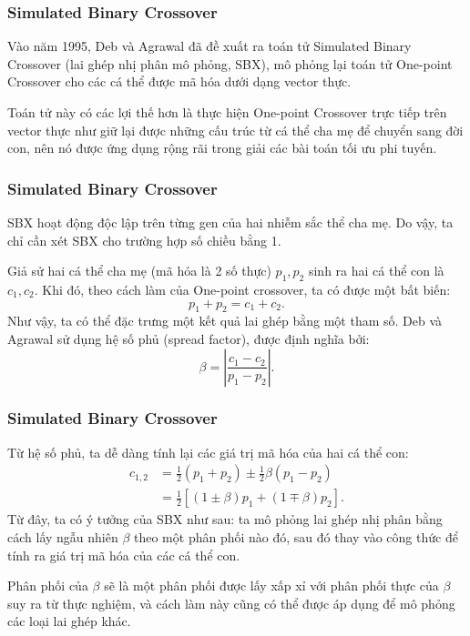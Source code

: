 \begin{frame}[fragile]
\frametitle{Simulated Binary Crossover}
Vào năm 1995, Deb và Agrawal đã đề xuất ra toán tử Simulated Binary Crossover
(lai ghép nhị phân mô phỏng, SBX), mô phỏng lại toán tử One-point Crossover cho
các cá thể được mã hóa dưới dạng vector thực.

Toán tử này có các lợi thế hơn là thực hiện One-point Crossover trực tiếp trên
vector thực như giữ lại được những cấu trúc từ cá thể cha mẹ để chuyển sang đời
con, nên nó được ứng dụng rộng rãi trong giải các bài toán tối ưu phi tuyến.
\end{frame}

\begin{frame}[fragile]
\frametitle{Simulated Binary Crossover}
SBX hoạt động độc lập trên từng gen của hai nhiễm sắc thể cha mẹ. Do vậy, ta chỉ
cần xét SBX cho trường hợp số chiều bằng 1.

Giả sử hai cá thể cha mẹ (mã hóa là 2 số thực) \( p_{1}, p_{2} \) sinh ra hai cá
thể con là \( c_{1}, c_{2} \). Khi đó, theo cách làm của One-point crossover, ta
có được một bất biến:
\[
  p_{1} + p_{2} = c_{1} + c_{2}
.\] 
Như vậy, ta có thể đặc trưng một kết quả lai ghép bằng một tham số. Deb và
Agrawal sử dụng hệ số phủ (spread factor), được định nghĩa bởi:
\[
  \beta = \left| \frac{c_{1} - c_{2}}{p_{1} - p_{2}} \right| 
.\] 
\end{frame}

\begin{frame}[fragile]
\frametitle{Simulated Binary Crossover}
Từ hệ số phủ, ta dễ dàng tính lại các giá trị mã hóa của hai cá thể con:
\begin{align*}
  c_{1,2} &= \frac{1}{2}(p_{1} + p_{2}) \pm \frac{1}{2}\beta(p_{1} - p_{2})\\
  &= \frac{1}{2} \left[ (1 \pm \beta)p_{1} + (1 \mp \beta) p_{2}  \right]
.\end{align*}
Từ đây, ta có ý tưởng của SBX như sau: ta mô phỏng lai ghép nhị phân bằng cách lấy
ngẫu nhiên $\beta$ theo một phân phối nào đó, sau đó thay vào công thức để tính
ra giá trị mã hóa của các cá thể con.

Phân phối của \( \beta \) sẽ là một phân phối được lấy xấp xỉ với phân phối thực
của \( \beta \) suy ra từ thực nghiệm, và cách làm này cũng có thể được áp dụng
để mô phỏng các loại lai ghép khác.
\end{frame}

